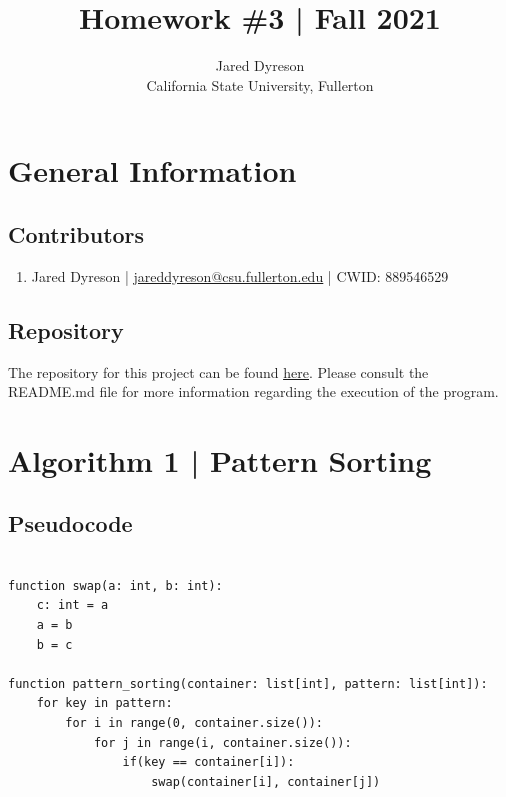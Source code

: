 \documentclass{article}
\title{Homework \#3 | Fall 2021}
\author{Jared Dyreson\\ 
        California State University, Fullerton}
\begin{document}
\maketitle
\tableofcontents

\newpage

\section{General Information}

\subsection{Contributors}

\begin{enumerate}
\item Jared Dyreson | \href{mailto:jareddyreson@csu.fullerton}{\underline{jareddyreson@csu.fullerton.edu}} | CWID: 889546529
\end{enumerate}

\subsection{Repository}

The repository for this project can be found \href{https://github.com/JaredDyreson/CS335_Project3}{\underline{here}}. Please consult the README.md file for more information regarding the execution of the program.

\newpage

\section{Algorithm 1 | Pattern Sorting}

\subsection{Pseudocode}

\begin{verbatim}

function swap(a: int, b: int):
    c: int = a
    a = b
    b = c

function pattern_sorting(container: list[int], pattern: list[int]):
    for key in pattern:
        for i in range(0, container.size()):
            for j in range(i, container.size()):
                if(key == container[i]):
                    swap(container[i], container[j])
\end{verbatim}
\end{document}
